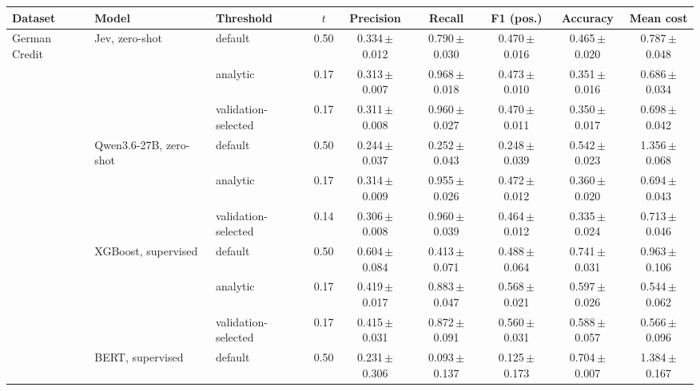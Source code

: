 \begin{tabular}{lllcccccc}
\toprule
Dataset & Model & Threshold & $t$ & Precision & Recall & F1 (pos.) & Accuracy & Mean cost \\
\midrule
\multirow{12}{*}{German Credit} & \multirow{3}{*}{Jev, zero-shot} & default & 0.50 & 0.334\,{\scriptsize$\pm$0.012} & 0.790\,{\scriptsize$\pm$0.030} & 0.470\,{\scriptsize$\pm$0.016} & 0.465\,{\scriptsize$\pm$0.020} & 0.787\,{\scriptsize$\pm$0.048} \\
 &  & analytic & 0.17 & 0.313\,{\scriptsize$\pm$0.007} & 0.968\,{\scriptsize$\pm$0.018} & 0.473\,{\scriptsize$\pm$0.010} & 0.351\,{\scriptsize$\pm$0.016} & 0.686\,{\scriptsize$\pm$0.034} \\
 &  & validation-selected & 0.17 & 0.311\,{\scriptsize$\pm$0.008} & 0.960\,{\scriptsize$\pm$0.027} & 0.470\,{\scriptsize$\pm$0.011} & 0.350\,{\scriptsize$\pm$0.017} & 0.698\,{\scriptsize$\pm$0.042} \\
\cmidrule(lr){2-9}
 & \multirow{3}{*}{Qwen3.6-27B, zero-shot} & default & 0.50 & 0.244\,{\scriptsize$\pm$0.037} & 0.252\,{\scriptsize$\pm$0.043} & 0.248\,{\scriptsize$\pm$0.039} & 0.542\,{\scriptsize$\pm$0.023} & 1.356\,{\scriptsize$\pm$0.068} \\
 &  & analytic & 0.17 & 0.314\,{\scriptsize$\pm$0.009} & 0.955\,{\scriptsize$\pm$0.026} & 0.472\,{\scriptsize$\pm$0.012} & 0.360\,{\scriptsize$\pm$0.020} & 0.694\,{\scriptsize$\pm$0.043} \\
 &  & validation-selected & 0.14 & 0.306\,{\scriptsize$\pm$0.008} & 0.960\,{\scriptsize$\pm$0.039} & 0.464\,{\scriptsize$\pm$0.012} & 0.335\,{\scriptsize$\pm$0.024} & 0.713\,{\scriptsize$\pm$0.046} \\
\cmidrule(lr){2-9}
 & \multirow{3}{*}{XGBoost, supervised} & default & 0.50 & 0.604\,{\scriptsize$\pm$0.084} & 0.413\,{\scriptsize$\pm$0.071} & 0.488\,{\scriptsize$\pm$0.064} & 0.741\,{\scriptsize$\pm$0.031} & 0.963\,{\scriptsize$\pm$0.106} \\
 &  & analytic & 0.17 & 0.419\,{\scriptsize$\pm$0.017} & 0.883\,{\scriptsize$\pm$0.047} & 0.568\,{\scriptsize$\pm$0.021} & 0.597\,{\scriptsize$\pm$0.026} & 0.544\,{\scriptsize$\pm$0.062} \\
 &  & validation-selected & 0.17 & 0.415\,{\scriptsize$\pm$0.031} & 0.872\,{\scriptsize$\pm$0.091} & 0.560\,{\scriptsize$\pm$0.031} & 0.588\,{\scriptsize$\pm$0.057} & 0.566\,{\scriptsize$\pm$0.096} \\
\cmidrule(lr){2-9}
 & \multirow{3}{*}{BERT, supervised} & default & 0.50 & 0.231\,{\scriptsize$\pm$0.306} & 0.093\,{\scriptsize$\pm$0.137} & 0.125\,{\scriptsize$\pm$0.173} & 0.704\,{\scriptsize$\pm$0.007} & 1.384\,{\scriptsize$\pm$0.167} \\

\end{tabular}
